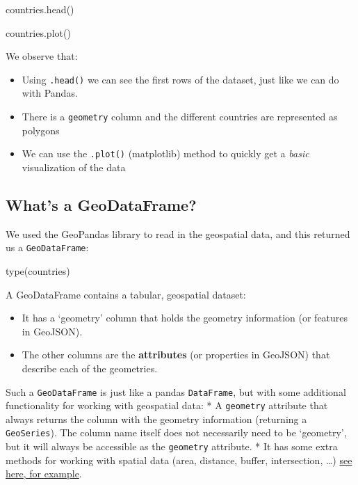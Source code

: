\documentclass[
  letterpaper,
  DIV=11,
  numbers=noendperiod]{scrreprt}
\newenvironment{Shaded}{\begin{snugshade}}{\end{snugshade}}
\newcommand{\BuiltInTok}[1]{\textcolor[rgb]{0.00,0.23,0.31}{#1}}
\newcommand{\NormalTok}[1]{\textcolor[rgb]{0.00,0.23,0.31}{#1}}
\providecommand{\tightlist}{%
  \setlength{\itemsep}{0pt}\setlength{\parskip}{0pt}}\usepackage{longtable,booktabs,array}
\begin{document}
\begin{Shaded}
\begin{Highlighting}[]
\NormalTok{countries.head()}
\end{Highlighting}
\end{Shaded}

\begin{Shaded}
\begin{Highlighting}[]
\NormalTok{countries.plot()}
\end{Highlighting}
\end{Shaded}

We observe that:

\begin{itemize}
\tightlist
\item
  Using \texttt{.head()} we can see the first rows of the dataset, just
  like we can do with Pandas.
\item
  There is a \texttt{geometry} column and the different countries are
  represented as polygons
\item
  We can use the \texttt{.plot()} (matplotlib) method to quickly get a
  \emph{basic} visualization of the data
\end{itemize}

\subsection{What's a GeoDataFrame?}\label{whats-a-geodataframe}

We used the GeoPandas library to read in the geospatial data, and this
returned us a \texttt{GeoDataFrame}:

\begin{Shaded}
\begin{Highlighting}[]
\BuiltInTok{type}\NormalTok{(countries)}
\end{Highlighting}
\end{Shaded}

A GeoDataFrame contains a tabular, geospatial dataset:

\begin{itemize}
\tightlist
\item
  It has a `geometry' column that holds the geometry information (or
  features in GeoJSON).
\item
  The other columns are the \textbf{attributes} (or properties in
  GeoJSON) that describe each of the geometries.
\end{itemize}

Such a \texttt{GeoDataFrame} is just like a pandas \texttt{DataFrame},
but with some additional functionality for working with geospatial data:
* A \texttt{geometry} attribute that always returns the column with the
geometry information (returning a \texttt{GeoSeries}). The column name
itself does not necessarily need to be `geometry', but it will always be
accessible as the \texttt{geometry} attribute. * It has some extra
methods for working with spatial data (area, distance, buffer,
intersection, \ldots)
\href{https://github.com/jorisvandenbossche/geopandas-tutorial/blob/main/04-spatial-operations-overlays.ipynb}{see
here, for example}.
\end{document}
